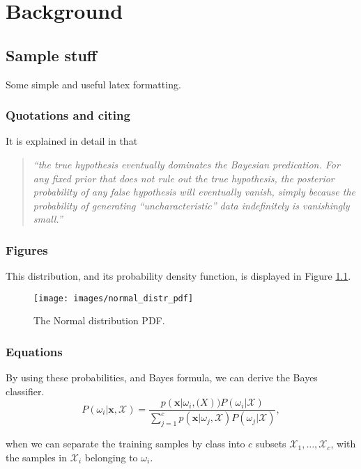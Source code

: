 \chapter{Background}
\label{ch:background}

\section{Sample stuff}
Some simple and useful latex formatting.

\subsection{Quotations and citing}
It is explained in detail in \cite[Ch.20]{Norvig03} that

\begin{quotation}
\noindent \textit{``the true hypothesis eventually dominates the Bayesian 
predication. For any fixed prior that does not rule out the true hypothesis, the 
posterior probability of any false hypothesis will eventually vanish, simply 
because the probability of generating ``uncharacteristic'' data indefinitely is 
vanishingly small.''}
\end{quotation}

\subsection{Figures}
This distribution, and its probability density function, is displayed in Figure 
\ref{fig:gaussian_distr_pdf}.
\begin{figure}[ht]
    \center\texttt{[image: images/normal\_distr\_pdf]}	
    \label{fig:gaussian_distr_pdf}
    \caption{The Normal distribution PDF.}
\end{figure}

\subsection{Equations}
By using these probabilities, and Bayes formula, we can derive the Bayes 
classifier.
\begin{equation}
    P(\omega_i | \boldsymbol{x}, \mathcal{X}) = \frac{p(\boldsymbol{x}|\omega_i, 
    \mathcal(X))P(\omega_i|\mathcal{X})}{\sum_{j=1}^{c}p(\boldsymbol{x}|\omega_j, 
    \mathcal{X})P(\omega_j|\mathcal{X})},
    \label{eq:bayes_formula_1}
\end{equation}

when we can separate the training samples by class into $c$ subsets 
$\mathcal{X}_1, \ldots, \mathcal{X}_c$, with the samples in $\mathcal{X}_i$ 
belonging to $\omega_i$.


